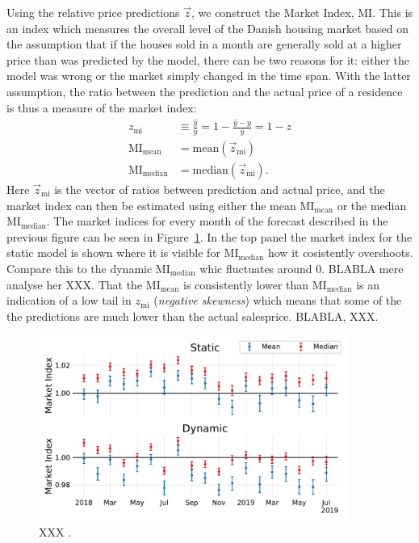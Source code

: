 Using the relative price predictions $\vec{z}$, we construct the Market Index, $\mathrm{MI}$. This is an index which measures the overall level of the Danish housing market based on the assumption that if the houses sold in a month are generally sold at a higher price than was predicted by the model, there can be two reasons for it: either the model was wrong or the market simply changed in the time span. With the latter assumption, the ratio between the prediction and the actual price of a residence is thus a measure of the market index:
\begin{equation}
  \begin{split}
    z_\mathrm{mi} &\equiv \frac{\hat{y}}{y} = 1 - \frac{\hat{y}-y}{y}  = 1-z \\
    \mathrm{MI}_\mathrm{mean} &= \mathrm{mean}(\vec{z}_\mathrm{mi}) \\
    \mathrm{MI}_\mathrm{median} &= \mathrm{median}(\vec{z}_\mathrm{mi}).
  \end{split}
\end{equation}
Here $\vec{z}_\mathrm{mi}$ is the vector of ratios between prediction and actual price, and the market index can then be estimated using either the mean $\mathrm{MI}_\mathrm{mean}$ or the median $\mathrm{MI}_\mathrm{median}$. The market indices for every month of the forecast described in the previous figure can be seen in Figure~\ref{fig:h:forecast_MarketIndex}. In the top panel the market index for the static model is shown where it is visible for $\mathrm{MI}_\mathrm{median}$ how it cosistently overshoots. Compare this to the dynamic $\mathrm{MI}_\mathrm{median}$ whic fluctuates around \num{0}. BLABLA mere analyse her XXX. That the $\mathrm{MI}_\mathrm{mean}$ is consistently lower than $\mathrm{MI}_\mathrm{median}$ is an indication of a low tail in $z_\mathrm{mi}$ (\emph{negative skewness}) which means that some of the the predictions are much lower than the actual salesprice. BLABLA, XXX.

\begin{figure}
  \includegraphics[width=0.9\textwidth, trim=0 0 0 0, clip]{figures/housing/Ejerlejlighed_v19_cut_all_Ncols_all_xgb_forecast_prediction_MarketIndex.pdf}
  \caption[2018 XGB Forecast]
          {XXX \TODO.} 
  \label{fig:h:forecast_MarketIndex}
\end{figure}


